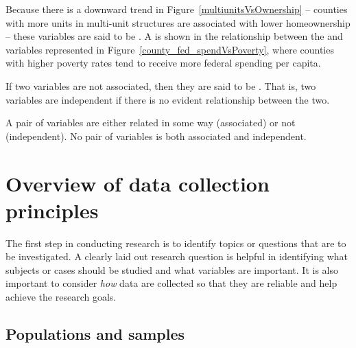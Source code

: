 Because there is a downward trend in Figure~\ref{multiunitsVsOwnership} -- counties with more units in multi-unit structures are associated with lower homeownership -- these variables are said to be . A  is shown in the relationship between the  and  variables represented in Figure~\ref{county_fed_spendVsPoverty}, where counties with higher poverty rates tend to receive more federal spending per capita.

If two variables are not associated, then they are said to be . That is, two variables are independent if there is no evident relationship between the two.

\begin{termBox}{
A pair of variables are either related in some way (associated) or not (independent). No pair of variables is both associated and independent.}
\end{termBox}


\section[Overview of data collection principles]{Overview of data collection principles }
\label{overviewOfDataCollectionPrinciples}


The first step in conducting research is to identify topics or questions that are to be investigated. A clearly laid out research question is helpful in identifying what subjects or cases should be studied and what variables are important. It is also important to consider \emph{how} data are collected so that they are reliable and help achieve the research goals.

\subsection{Populations and samples}
\label{populationsAndSamples}

